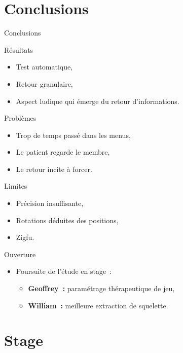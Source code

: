 \section{Conclusions}

\begin{frame}{Conclusions}
{
  \begin{block}{Résultats}
  \begin{itemize}
  \item Test automatique,
  \item Retour granulaire,
  \item Aspect ludique qui émerge du retour d'informations.
  \end{itemize}
  \end{block}
}
{
  \begin{alertblock}{Problèmes}
  \begin{itemize}
  \item Trop de temps passé dans les menus,
  \item Le patient regarde le membre,
  \item Le retour incite à forcer.
  \end{itemize}
  \end{alertblock}
}
{
  \begin{alertblock}{Limites}
  \begin{itemize}
  \item Précision insuffisante,
  \item Rotations déduites des positions,
  \item Zigfu.
  \end{itemize}
  \end{alertblock}
}
{
  \begin{block}{Ouverture}
  \begin{itemize}
  \item Poursuite de l'étude en stage~:
  \begin{itemize}
  \item \textbf{Geoffrey~:} paramétrage thérapeutique de jeu,
  \item \textbf{William~:} meilleure extraction de squelette. 
  \end{itemize}
  \end{itemize}
  \end{block}
}
\end{frame}

\section{Stage}

